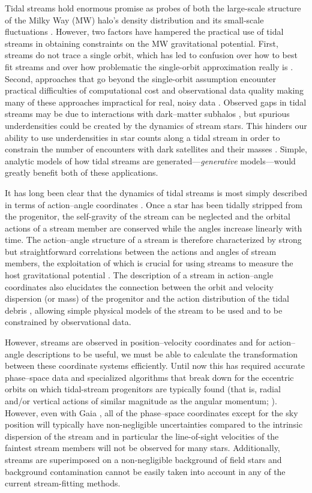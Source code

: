 \documentclass{emulateapj}
\newcommand{\eg}{e.g.}
\begin{document}
Tidal streams hold enormous promise as probes of both the large-scale
structure of the Milky Way (MW) halo's density distribution
\citep[\eg,][]{Johnston99a,Koposov10a} and its small-scale
fluctuations \citep{Carlberg12a}. However, two factors have hampered
the practical use of tidal streams in obtaining constraints on the MW
gravitational potential. First, streams do not trace a single orbit,
which has led to confusion over how to best fit streams and over how
problematic the single-orbit approximation really is
\citep{Eyre11a,Sanders13a}. Second, approaches that go beyond the
single-orbit assumption encounter practical difficulties of
computational cost and observational data quality making many of these
approaches impractical for real, noisy data
\citep{Sanders13b,PriceWhelan13a}. Observed gaps in tidal streams may
be due to interactions with dark--matter subhalos \citep{Yoon11a}, but
spurious underdensities could be created by the dynamics of stream
stars. This hinders our ability to use underdensities in star counts
along a tidal stream in order to constrain the number of encounters
with dark satellites and their masses \citep{Ngan14a}. Simple,
analytic models of how tidal streams are generated---\emph{generative}
models---would greatly benefit both of these applications.

It has long been clear that the dynamics of tidal streams is most
simply described in terms of action--angle coordinates
\citep{Tremaine99a,Helmi99a}. Once a star has been tidally stripped
from the progenitor, the self-gravity of the stream can be neglected
and the orbital actions of a stream member are conserved while the
angles increase linearly with time. The action--angle structure of a
stream is therefore characterized by strong but straightforward
correlations between the actions and angles of stream members, the
exploitation of which is crucial for using streams to measure the host
gravitational potential \citep{Sanders13b}. The description of a
stream in action--angle coordinates also elucidates the connection
between the orbit and velocity dispersion (or mass) of the progenitor
and the action distribution of the tidal debris \citep{Eyre11a},
allowing simple physical models of the stream to be used and to be
constrained by observational data.

However, streams are observed in position--velocity coordinates and
for action--angle descriptions to be useful, we must be able to
calculate the transformation between these coordinate systems
efficiently. Until now this has required accurate phase--space data
and specialized algorithms that break down for the eccentric orbits on
which tidal-stream progenitors are typically found (that is, radial
and/or vertical actions of similar magnitude as the angular momentum;
\citealt{Sanders12a}). However, even with Gaia \citep{Perryman01a},
all of the phase--space coordinates except for the sky position will
typically have non-negligible uncertainties compared to the intrinsic
dispersion of the stream and in particular the line-of-sight
velocities of the faintest stream members will not be observed for
many stars. Additionally, streams are superimposed on a non-negligible
background of field stars and background contamination cannot be
easily taken into account in any of the current stream-fitting
methods.
\end{document}
